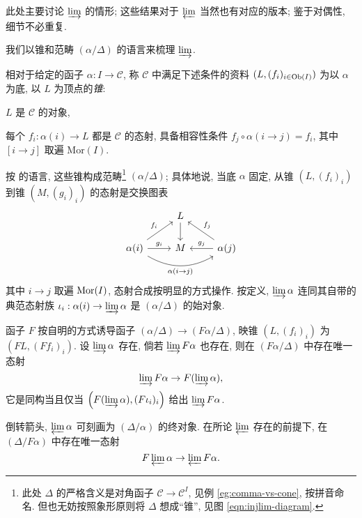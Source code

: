 此处主要讨论 $\varinjlim$ 的情形; 这些结果对于 $\varprojlim$ 当然也有对应的版本; 鉴于对偶性, 细节不必重复.

我们以锥和范畴 $(\alpha/\Delta)$ 的语言来梳理 $\varinjlim$.

\begin{convention}\label{con:limit-cone}
	相对于给定的函子 $\alpha: I \to \mathcal{C}$, 称 $\mathcal{C}$ 中满足下述条件的资料 $(L, (f_i)_{i \in \operatorname{Ob}(I)})$ 为以 $\alpha$ 为底, 以 $L$ 为顶点的\emph{锥}:
	\begin{compactitem}
		\item $L$ 是 $\mathcal{C}$ 的对象,
		\item 每个 $f_i : \alpha(i) \to L$ 都是 $\mathcal{C}$ 的态射, 具备相容性条件 $f_j \circ \alpha(i \to j) = f_i$, 其中 $[i \to j]$ 取遍 $\mathrm{Mor}(I)$.
	\end{compactitem}
\end{convention}

按 \cite[\S 2.7]{Li1} 的语言, 这些锥构成范畴\footnote{此处 $\Delta$ 的严格含义是对角函子 $\mathcal{C} \to \mathcal{C}^I$, 见例 \ref{eg:comma-vs-cone}, 按拼音命名. 但也无妨按照象形原则将 $\Delta$ 想成``锥'', 见图 \eqref{eqn:injlim-diagram}.} $(\alpha / \Delta)$; 具体地说, 当底 $\alpha$ 固定, 从锥 $(L, (f_i)_i)$ 到锥 $(M, (g_i)_i)$ 的态射是交换图表
\begin{equation}\label{eqn:injlim-diagram}\begin{tikzcd}
	& L \arrow[d] & \\
	\alpha(i) \arrow[bend right, rr, "\alpha(i \to j)"'] \arrow[r, "g_i"] \arrow[ru, "f_i"] & M & \alpha(j) \arrow[l, "{g_j}"'] \arrow[lu, "f_j"']
\end{tikzcd}\end{equation}
其中 $i \to j$ 取遍 $\operatorname{Mor}(I)$, 态射合成按明显的方式操作. 按定义, $\varinjlim \alpha$ 连同其自带的典范态射族 $\iota_i: \alpha(i) \to \varinjlim \alpha$ 是 $(\alpha / \Delta)$ 的始对象.

函子 $F$ 按自明的方式诱导函子 $(\alpha/\Delta) \to (F\alpha / \Delta)$, 映锥 $(L, (f_i)_i)$ 为 $(FL, (Ff_i)_i)$. 设 $\varinjlim \alpha$ 存在, 倘若 $\varinjlim F\alpha$ 也存在, 则在 $(F\alpha / \Delta)$ 中存在唯一态射
\[ \varinjlim F\alpha \to F(\varinjlim \alpha), \]
它是同构当且仅当 $\left( F(\varinjlim \alpha), (F\iota_i)_i \right)$ 给出 $\varinjlim F\alpha$.

倒转箭头, $\varprojlim \alpha$ 可刻画为 $(\Delta/\alpha)$ 的终对象. 在所论 $\varprojlim$ 存在的前提下, 在 $(\Delta/F\alpha)$ 中存在唯一态射
\[ F\varprojlim \alpha \to \varprojlim F\alpha. \]

